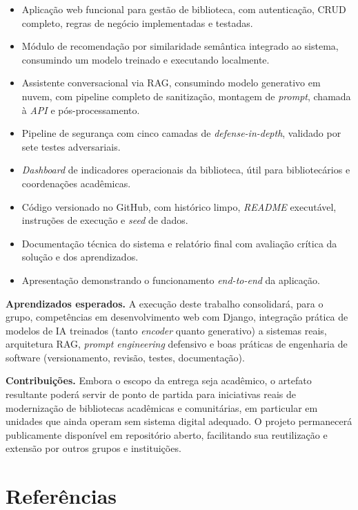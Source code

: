 \documentclass[monografia,abnt]{inf-ufg-modificado}
\begin{document}
\begin{itemize}
    \item Aplicação web funcional para gestão de biblioteca, com autenticação, CRUD completo, regras de negócio implementadas e testadas.
    \item Módulo de recomendação por similaridade semântica integrado ao sistema, consumindo um modelo treinado e executando localmente.
    \item Assistente conversacional via RAG, consumindo modelo generativo em nuvem, com pipeline completo de sanitização, montagem de \textit{prompt}, chamada à \textit{API} e pós-processamento.
    \item Pipeline de segurança com cinco camadas de \textit{defense-in-depth}, validado por sete testes adversariais.
    \item \textit{Dashboard} de indicadores operacionais da biblioteca, útil para bibliotecários e coordenações acadêmicas.
    \item Código versionado no GitHub, com histórico limpo, \textit{README} executável, instruções de execução e \textit{seed} de dados.
    \item Documentação técnica do sistema e relatório final com avaliação crítica da solução e dos aprendizados.
    \item Apresentação demonstrando o funcionamento \textit{end-to-end} da aplicação.
\end{itemize}

\noindent\textbf{Aprendizados esperados.} A execução deste trabalho consolidará, para o grupo, competências em desenvolvimento web com Django, integração prática de modelos de IA treinados (tanto \textit{encoder} quanto generativo) a sistemas reais, arquitetura RAG, \textit{prompt engineering} defensivo e boas práticas de engenharia de software (versionamento, revisão, testes, documentação).

\noindent\textbf{Contribuições.} Embora o escopo da entrega seja acadêmico, o artefato resultante poderá servir de ponto de partida para iniciativas reais de modernização de bibliotecas acadêmicas e comunitárias, em particular em unidades que ainda operam sem sistema digital adequado. O projeto permanecerá publicamente disponível em repositório aberto, facilitando sua reutilização e extensão por outros grupos e instituições.

\chapter{Referências}
\end{document}
